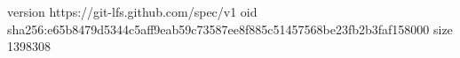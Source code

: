 version https://git-lfs.github.com/spec/v1
oid sha256:e65b8479d5344c5aff9eab59c73587ee8f885c51457568be23fb2b3faf158000
size 1398308
